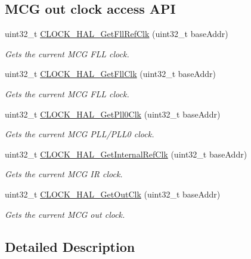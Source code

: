 \subsection*{M\+CG out clock access A\+PI}
\begin{DoxyCompactItemize}
\item 
uint32\+\_\+t \hyperlink{group__mcg__hal_ga68388ab5996ebb28f4ea81c2eee29e33}{C\+L\+O\+C\+K\+\_\+\+H\+A\+L\+\_\+\+Get\+Fll\+Ref\+Clk} (uint32\+\_\+t base\+Addr)
\begin{DoxyCompactList}\small\item\em Gets the current M\+CG F\+LL clock. \end{DoxyCompactList}\item 
uint32\+\_\+t \hyperlink{group__mcg__hal_ga58242117c3ca0ed4adbe3e26c07c59ed}{C\+L\+O\+C\+K\+\_\+\+H\+A\+L\+\_\+\+Get\+Fll\+Clk} (uint32\+\_\+t base\+Addr)
\begin{DoxyCompactList}\small\item\em Gets the current M\+CG F\+LL clock. \end{DoxyCompactList}\item 
uint32\+\_\+t \hyperlink{group__mcg__hal_gaaee6f62e4fb58ce3fbff9e9bb76434a3}{C\+L\+O\+C\+K\+\_\+\+H\+A\+L\+\_\+\+Get\+Pll0\+Clk} (uint32\+\_\+t base\+Addr)
\begin{DoxyCompactList}\small\item\em Gets the current M\+CG P\+L\+L/\+P\+L\+L0 clock. \end{DoxyCompactList}\item 
uint32\+\_\+t \hyperlink{group__mcg__hal_ga5e3ac63eae70a38cb35357d96e4f55f1}{C\+L\+O\+C\+K\+\_\+\+H\+A\+L\+\_\+\+Get\+Internal\+Ref\+Clk} (uint32\+\_\+t base\+Addr)
\begin{DoxyCompactList}\small\item\em Gets the current M\+CG IR clock. \end{DoxyCompactList}\item 
uint32\+\_\+t \hyperlink{group__mcg__hal_ga57fa8d0087975cb62b490b6d0947b0a7}{C\+L\+O\+C\+K\+\_\+\+H\+A\+L\+\_\+\+Get\+Out\+Clk} (uint32\+\_\+t base\+Addr)
\begin{DoxyCompactList}\small\item\em Gets the current M\+CG out clock. \end{DoxyCompactList}\end{DoxyCompactItemize}


\subsection{Detailed Description}


